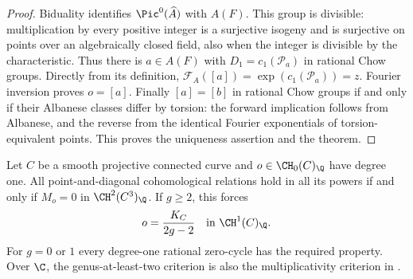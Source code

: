 \begin{proof}
Biduality identifies $\Pic^0(\widehat A)$ with $A(F)$. This group is divisible: multiplication by every positive integer is a surjective isogeny and is surjective on points over an algebraically closed field, also when the integer is divisible by the characteristic. Thus there is $a\in A(F)$ with $D_1=c_1(\mathcal P_a)$ in rational Chow groups. Directly from its definition, $\mathcal F_A([a])=\exp(c_1(\mathcal P_a))=z$. Fourier inversion proves $o=[a]$. Finally $[a]=[b]$ in rational Chow groups if and only if their Albanese classes differ by torsion: the forward implication follows from Albanese, and the reverse from the identical Fourier exponentials of torsion-equivalent points. This proves the uniqueness assertion and the theorem.
\end{proof}

\begin{proposition}
\label{c:curve-chow-criterion}
Let $C$ be a smooth projective connected curve and $o\in\CH_0(C)_\Q$ have degree one. All point-and-diagonal cohomological relations hold in all its powers if and only if $M_o=0$ in $\CH^2(C^3)_\Q$. If $g\geq2$, this forces
\[
 o=\frac{K_C}{2g-2}\quad\text{in }\CH^1(C)_\Q.
\]
For $g=0$ or $1$ every degree-one rational zero-cycle has the required property. Over $\C$, the genus-at-least-two criterion is also the multiplicativity criterion in \citet[Propositions 3.1 and 3.5]{c_fulaterveervial2021}.
\end{proposition}

